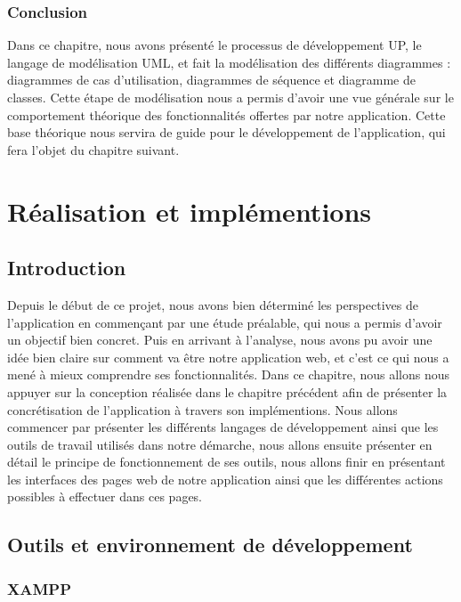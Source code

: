 \documentclass[french]{report}
\begin{document}
        \subsection{Conclusion}
        Dans ce chapitre, nous avons présenté le processus de développement UP, le langage de modélisation UML,
	et fait la modélisation des différents diagrammes : diagrammes de cas d'utilisation,
	diagrammes de séquence et diagramme de classes. Cette étape de modélisation nous a permis
	d'avoir une vue générale sur le comportement théorique des fonctionnalités offertes par
	notre application. Cette base théorique nous servira de guide pour le développement de
	l'application, qui fera l'objet du chapitre suivant.



\chapter{Réalisation et implémentions}

\section{Introduction}

Depuis le début de ce projet, nous avons bien déterminé les perspectives de
l'application en commençant par une étude préalable, qui nous a permis d'avoir
un objectif bien concret. Puis en arrivant à l'analyse, nous avons pu avoir une
idée bien claire sur comment va être notre application web, et c'est ce qui nous
a mené à mieux comprendre ses fonctionnalités. Dans ce chapitre, nous allons
nous appuyer sur la conception réalisée dans le chapitre précédent afin de
présenter la concrétisation de l'application à travers son implémentions. Nous
allons commencer par présenter les différents langages de développement ainsi
que les outils de travail utilisés dans notre démarche, nous allons ensuite
présenter en détail le principe de fonctionnement de ses outils, nous allons
finir en présentant les interfaces des pages web de notre application ainsi que
les différentes actions possibles à effectuer dans ces pages.
    
\section{Outils et environnement de développement}

\subsection{XAMPP}
\end{document}
